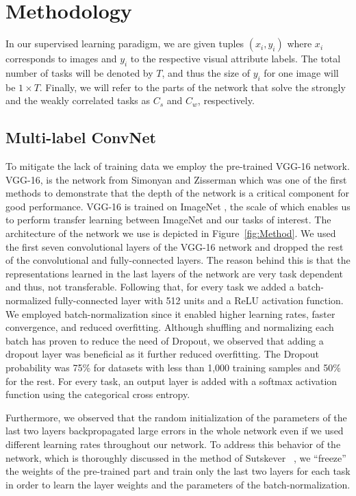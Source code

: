 \documentclass[10pt,twocolumn,letterpaper]{article}
\begin{document}
	\section{Methodology}
	In our supervised learning paradigm, we are given tuples \((x_i,y_i)\) where \(x_i\) corresponds to images and \(y_i\) to the respective visual attribute labels. The total number of tasks will be denoted by \(T\), and thus the size of \(y_i\) for one image will be \(1\times T\). Finally, we will refer to the parts of the network that solve the strongly and the weakly correlated tasks as \(C_s\) and \(C_w\), respectively. 
	
	\subsection{Multi-label ConvNet}
	To mitigate the lack of training data we employ the pre-trained VGG-16 \cite{simonyan2014very} network.  VGG-16, is the network from Simonyan and Zisserman which was one of the first methods to demonstrate that the depth of the network is a critical component for good performance. VGG-16 is trained on ImageNet \cite{russakovsky2015imagenet}, the scale of which enables us to perform transfer learning between ImageNet and our tasks of interest. The architecture of the network we use is depicted in Figure~\ref{fig:Method}. We used the first seven convolutional layers of the VGG-16 network and dropped the rest of the convolutional and fully-connected layers. The reason behind this is that the representations learned in the last layers of the network are very task dependent \cite{yosinski2014transferable} and thus, not transferable. Following that, for every task we added a batch-normalized \cite{ioffe2015batch} fully-connected layer with 512 units and a ReLU activation function. We employed batch-normalization since it enabled higher learning rates, faster convergence, and reduced overfitting. Although shuffling and normalizing each batch has proven to reduce the need of Dropout, we observed that adding a dropout layer \cite{srivastava2014dropout} was beneficial as it further reduced overfitting. The Dropout probability was 75\% for datasets with less than 1,000 training samples and 50\% for the rest. For every task, an output layer is added with a softmax activation function using the categorical cross entropy.
	
	Furthermore, we observed that the random initialization of the parameters of the last two layers backpropagated large errors in the whole network even if we used different learning rates throughout our network. To address this behavior of the network, which is thoroughly discussed in the method of Sutskever \etal~\cite{sutskever2013importance}, we ``freeze'' the weights of the pre-trained part and train only the last two layers for each task in order to learn the layer weights and the parameters of the batch-normalization. 
	
\end{document}
